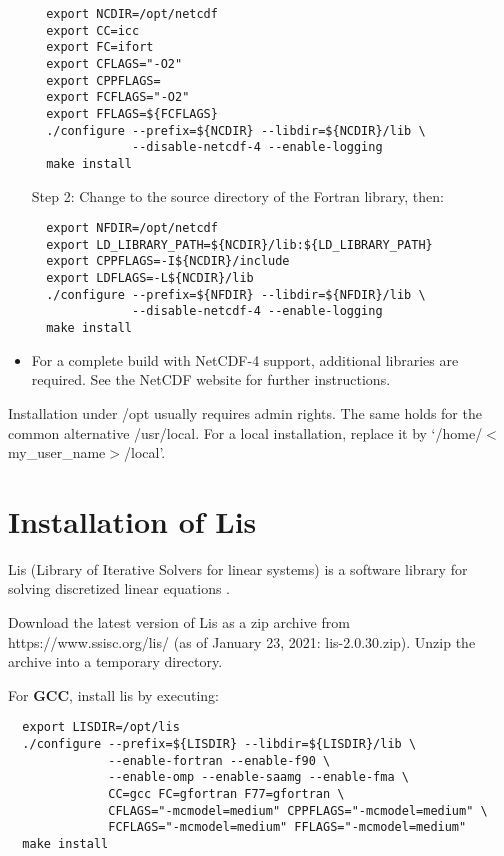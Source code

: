 \documentclass[12pt,a4paper]{article}
\begin{document}
\begin{appendix}
\begin{itemize}
\begin{verbatim}
  export NCDIR=/opt/netcdf
  export CC=icc
  export FC=ifort
  export CFLAGS="-O2"
  export CPPFLAGS=
  export FCFLAGS="-O2"
  export FFLAGS=${FCFLAGS}
  ./configure --prefix=${NCDIR} --libdir=${NCDIR}/lib \
              --disable-netcdf-4 --enable-logging
  make install
\end{verbatim}

Step 2: Change to the source directory of the Fortran library, then:

\begin{verbatim}
  export NFDIR=/opt/netcdf
  export LD_LIBRARY_PATH=${NCDIR}/lib:${LD_LIBRARY_PATH}
  export CPPFLAGS=-I${NCDIR}/include
  export LDFLAGS=-L${NCDIR}/lib
  ./configure --prefix=${NFDIR} --libdir=${NFDIR}/lib \
              --disable-netcdf-4 --enable-logging
  make install
\end{verbatim}

\item For a complete build with NetCDF-4 support, additional libraries are required. See the NetCDF website for further instructions.

\end{itemize}

Installation under /opt usually requires admin rights. The same holds for the common alternative /usr/local. For a local installation, replace it by `/home/$<$my\_user\_name$>$/local'.

\section{Installation of Lis}
\label{sect_install_lis}

Lis (Library of Iterative Solvers for linear systems) is a software library for solving discretized linear equations \citep{nishida_2010}.

Download the latest version of Lis as a zip archive from https://www.ssisc.org/lis/ (as of January 23, 2021: lis-2.0.30.zip). Unzip the archive into a temporary directory.

For \textbf{GCC}, install lis by executing:

\begin{verbatim}
  export LISDIR=/opt/lis
  ./configure --prefix=${LISDIR} --libdir=${LISDIR}/lib \
              --enable-fortran --enable-f90 \
              --enable-omp --enable-saamg --enable-fma \
              CC=gcc FC=gfortran F77=gfortran \
              CFLAGS="-mcmodel=medium" CPPFLAGS="-mcmodel=medium" \
              FCFLAGS="-mcmodel=medium" FFLAGS="-mcmodel=medium"
  make install
\end{verbatim}


\end{appendix}
\end{document}
